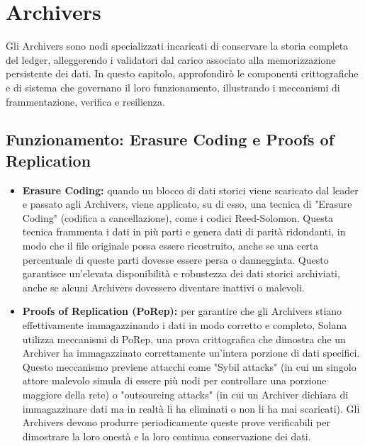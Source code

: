\documentclass[a4paper,12pt]{report}
\begin{document}
	\section{Archivers}
	
	Gli Archivers sono nodi specializzati incaricati di conservare la storia completa del ledger, alleggerendo i validatori dal carico associato alla memorizzazione persistente dei dati. In questo capitolo, approfondirò le componenti crittografiche e di sistema che governano il loro funzionamento, illustrando i meccanismi di frammentazione, verifica e resilienza.
	
	\subsection{Funzionamento: Erasure Coding e Proofs of Replication}
	\begin{itemize}
		\item \textbf{Erasure Coding:} quando un blocco di dati storici viene scaricato dal leader e passato agli Archivers, viene applicato, su di esso, una tecnica di "Erasure Coding" (codifica a cancellazione), come i codici Reed-Solomon. Questa tecnica frammenta i dati in più parti e genera dati di parità ridondanti, in modo che il file originale possa essere ricostruito, anche se una certa percentuale di queste parti dovesse essere persa o danneggiata. Questo garantisce un'elevata disponibilità e robustezza dei dati storici archiviati, anche se alcuni Archivers dovessero diventare inattivi o malevoli.
		\item \textbf{Proofs of Replication (PoRep):} per garantire che gli Archivers stiano effettivamente immagazzinando i dati in modo corretto e completo, Solana utilizza meccanismi di PoRep, una prova crittografica che dimostra che un Archiver ha immagazzinato correttamente un'intera porzione di dati specifici. Questo meccanismo previene attacchi come "Sybil attacks" (in cui un singolo attore malevolo simula di essere più nodi per controllare una porzione maggiore della rete) o "outsourcing attacks" (in cui un Archiver dichiara di immagazzinare dati ma in realtà li ha eliminati o non li ha mai scaricati). Gli Archivers devono produrre periodicamente queste prove verificabili per dimostrare la loro onestà e la loro continua conservazione dei dati.
	\end{itemize}
	
\end{document}
